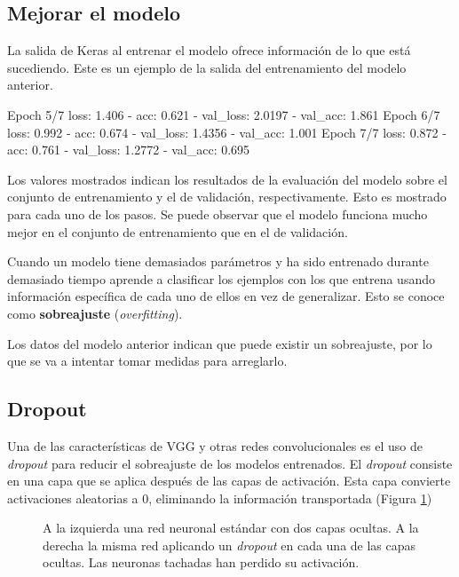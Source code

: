 \subsection{Mejorar el modelo}

La salida de Keras al entrenar el modelo ofrece información de lo que está sucediendo. Este es un ejemplo de la salida del entrenamiento del modelo anterior.

\begin{python}
Epoch 5/7
loss: 1.406 - acc: 0.621 - val_loss: 2.0197 - val_acc: 1.861
Epoch 6/7
loss: 0.992 - acc: 0.674 - val_loss: 1.4356 - val_acc: 1.001
Epoch 7/7
loss: 0.872 - acc: 0.761 - val_loss: 1.2772 - val_acc: 0.695
\end{python}

Los valores mostrados indican los resultados de la evaluación del modelo sobre el conjunto de entrenamiento y el de validación, respectivamente. Esto es mostrado para cada uno de los pasos. Se puede observar que el modelo funciona mucho mejor en el conjunto de entrenamiento que en el de validación.

Cuando un modelo tiene demasiados parámetros y ha sido entrenado durante demasiado tiempo aprende a clasificar los ejemplos con los que entrena usando información específica de cada uno de ellos en vez de generalizar. Esto se conoce como \textbf{sobreajuste} (\textit{overfitting}).

Los datos del modelo anterior indican que puede existir un sobreajuste, por lo que se va a intentar tomar medidas para arreglarlo.

\subsection{Dropout}

Una de las características de VGG y otras redes convolucionales es el uso de \textit{dropout} para reducir el sobreajuste de los modelos entrenados. El \textit{dropout} consiste en una capa que se aplica después de las capas de activación. Esta capa convierte activaciones aleatorias a 0, eliminando la información transportada (Figura \ref{dropout-net})

\begin{figure}
    \caption{A la izquierda una red neuronal estándar con dos capas ocultas. A la derecha la misma red aplicando un \textit{dropout} en cada una de las capas ocultas. Las neuronas tachadas han perdido su activación.}
\label{dropout-net}
\end{figure}



